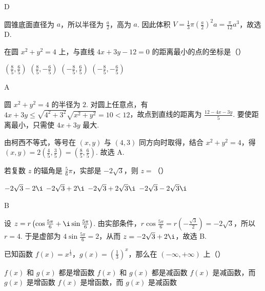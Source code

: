 \begin{answer}D\end{answer}

\begin{solution}
圆锥底面直径为 \(a\)，所以半径为 \(\frac a2\)，高为 \(a\). 因此体积 \(V=\frac13\pi\left(\frac a2\right)^{2}a=\frac\pi{12}a^{3}\)，故选 D.
\end{solution}

\begin{problem}
在圆 \(x^{2}+y^{2}=4\) 上，与直线 \(4x+3y-12=0\) 的距离最小的点的坐标是（\quad）

\choices
{\(\left(\frac85,\frac65\right)\)}
{\(\left(\frac85,-\frac65\right)\)}
{\(\left(-\frac85,\frac65\right)\)}
{\(\left(-\frac85,-\frac65\right)\)}
\end{problem}

\begin{answer}A\end{answer}

\begin{solution}
圆 \(x^{2}+y^{2}=4\) 的半径为 \(2\). 对圆上任意点，有 \(4x+3y\leqslant\sqrt{4^{2}+3^{2}}\sqrt{x^{2}+y^{2}}=10<12\)，故点到直线的距离为 \(\frac{12-4x-3y}{5}\). 要使距离最小，只需使 \(4x+3y\) 最大.

由柯西不等式，等号在 \((x,y)\) 与 \((4,3)\) 同方向时取得，结合 \(x^{2}+y^{2}=4\)，得 \((x,y)=2\left(\frac45,\frac35\right)=\left(\frac85,\frac65\right)\). 故选 A.
\end{solution}

\begin{problem}
若复数 \(z\) 的辐角是 \(\frac56\pi\)，实部是 \(-2\sqrt3\)，则 \(z=\)（\quad）

\choices
{\(-2\sqrt3-2\i\)}
{\(-2\sqrt3+2\i\)}
{\(-2\sqrt3+2\sqrt3\i\)}
{\(-2\sqrt3-2\sqrt3\i\)}
\end{problem}

\begin{answer}B\end{answer}

\begin{solution}
设 \(z=r\left(\cos\frac{5\pi}{6}+\i\sin\frac{5\pi}{6}\right)\). 由实部条件，\(r\cos\frac{5\pi}{6}=r\left(-\frac{\sqrt3}{2}\right)=-2\sqrt3\)，所以 \(r=4\). 于是虚部为 \(4\sin\frac{5\pi}{6}=2\)，从而 \(z=-2\sqrt3+2\i\)，故选 B.
\end{solution}

\begin{problem}
已知函数 \(f(x)=x^{\frac13}\)，\(g(x)=\left(\frac13\right)^x\)，那么在 \((-\infty,+\infty)\) 上（\quad）

\choices
{\(f(x)\) 和 \(g(x)\) 都是增函数}
{\(f(x)\) 和 \(g(x)\) 都是减函数}
{\(f(x)\) 是减函数，而 \(g(x)\) 是增函数}
{\(f(x)\) 是增函数，而 \(g(x)\) 是减函数}
\end{problem}

